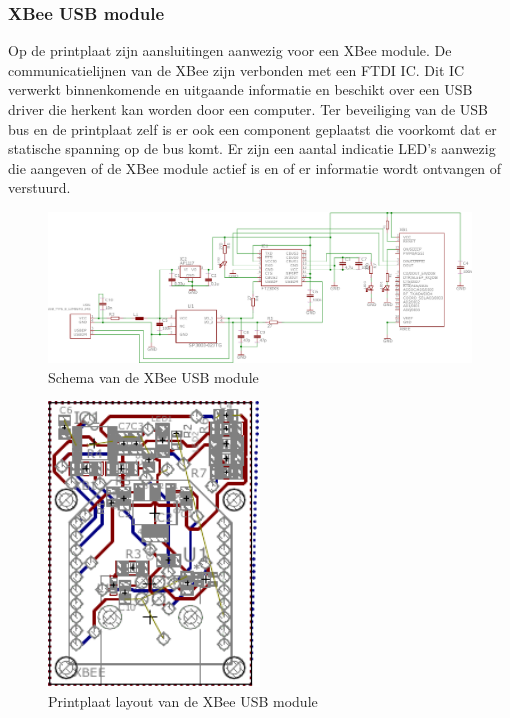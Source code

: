 \documentclass[10pt,a4paper]{article}
\begin{document}
\subsubsection{XBee USB module}
Op de printplaat zijn aansluitingen aanwezig voor een XBee module. De communicatielijnen van de XBee zijn verbonden met een FTDI IC. Dit IC verwerkt binnenkomende en uitgaande informatie en beschikt over een USB driver die herkent kan worden door een computer. Ter beveiliging van de USB bus en de printplaat zelf is er ook een component geplaatst die voorkomt dat er statische spanning op de bus komt. Er zijn een aantal indicatie LED's aanwezig die aangeven of de XBee module actief is en of er informatie wordt ontvangen of verstuurd.

\begin{figure}[h]
    \centering
    \includegraphics[width=1\textwidth]{schematic-xbee}
    \caption{Schema van de XBee USB module}
    \label{fig:schematic-xbee}
\end{figure}

\begin{figure}[h]
    \centering
    \includegraphics[width=0.5\textwidth]{board-xbee}
    \caption{Printplaat layout van de XBee USB module}
    \label{fig:board-xbee}
\end{figure}
\end{document}
